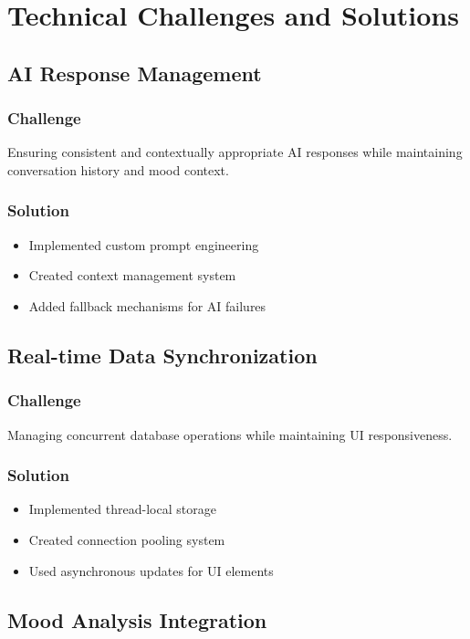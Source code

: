\documentclass[12pt]{article}
\begin{document}
\section{Technical Challenges and Solutions}

\subsection{AI Response Management}
\subsubsection{Challenge}
Ensuring consistent and contextually appropriate AI responses while maintaining conversation history and mood context.

\subsubsection{Solution}
\begin{itemize}
    \item Implemented custom prompt engineering
    \item Created context management system
    \item Added fallback mechanisms for AI failures
\end{itemize}

\subsection{Real-time Data Synchronization}
\subsubsection{Challenge}
Managing concurrent database operations while maintaining UI responsiveness.

\subsubsection{Solution}
\begin{itemize}
    \item Implemented thread-local storage
    \item Created connection pooling system
    \item Used asynchronous updates for UI elements
\end{itemize}

\subsection{Mood Analysis Integration}
\end{document}
